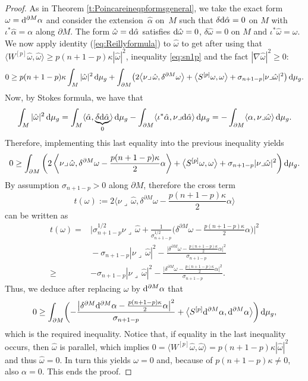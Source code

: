 \documentclass[pdftex]{sigma}
\numberwithin{equation}{section}
\begin{document}
\begin{proof} As in Theorem \ref{t:Poincareineqpformsgeneral}, we take the exact form $\omega={\rm d}^{\partial M}\alpha$ and consider the extension~$\hat\alpha$ on~$M$ such that $\delta {\rm d}\hat\alpha=0$ on $M$ with $\iota^*\hat\alpha=\alpha$ along $\partial M$.
The form $\hat\omega={\rm d}\hat\alpha$ satisfies ${\rm d}\hat\omega=0$, $\delta\hat\omega=0$ on $M$ and $\iota^*\hat\omega=\omega$.
We now apply identity (\ref{eq:Reillyformula}) to $\hat{\omega}$  to get after using that $\bigl\langle W^{[p]}\hat\omega,\hat\omega\bigr\rangle\geq p(n+1-p)\kappa|\hat\omega|^2$, inequality \eqref{eq:sn1p} and the fact $|\nabla\hat\omega|^2\geq 0$:
\[0\geq p(n+1-p)\kappa\int_M|\hat\omega|^2\,{\rm d}\mu_g+\int_{\partial M}\bigl(2\bigl\langle\nu\lrcorner\,\hat{\omega},\delta^{\partial M}\omega\bigr\rangle+\bigl\langle S^{[p]}\omega,\omega\bigr\rangle+\sigma_{n+1-p}|\nu\lrcorner\hat\omega|^2\bigr)\,{\rm d}\mu_g.
\]
Now, by Stokes formula, we have that
\[
\int_M|\hat\omega|^2\,{\rm d}\mu_g=\int_M\langle\hat\alpha,\underbrace{\delta {\rm d}\hat\alpha}_{0}\rangle\,{\rm d}\mu_g-\int_{\partial M}\langle\iota^*\hat\alpha,\nu\lrcorner {\rm d}\hat\alpha\rangle\,{\rm d}\mu_g=-\int_{\partial M}\langle\alpha,\nu\lrcorner\hat\omega\rangle\,{\rm d}\mu_g.
\]
Therefore, implementing this last equality into the previous i\-ne\-qua\-li\-ty yields
\[
0\geq \int_{\partial M}\left(2\left\langle\nu\lrcorner\,\hat{\omega},\delta^{\partial M}\omega-\frac{p(n+1-p)\kappa}{2}\alpha\right\rangle+\bigl\langle S^{[p]}\omega,\omega\bigr\rangle+\sigma_{n+1-p}|\nu\lrcorner\hat\omega|^2\right) {\rm d}\mu_g.
\]
By assumption $\sigma_{n+1-p}>0$ along $\partial M$, therefore the cross term
\[
t(\omega):=2\biggl\langle\nu\lrcorner\,\hat{\omega},\delta^{\partial M}\omega-\frac{p(n+1-p)\kappa}{2}\alpha\biggr\rangle
\] can be written as
\begin{align*} %
t(\omega)={}& \biggl|\sigma_{n+1-p}^{1/2}\nu\lrcorner\,\hat{\omega}+\frac{1}{\sigma_{n+1-p}^{1/2}}\bigl(\delta^{\partial M}\omega-\frac{p(n+1-p)\kappa}{2}\alpha\bigr)\biggr|^2\nonumber\\
&{}-\sigma_{n+1-p}|\nu\lrcorner\,\hat{\omega}|^2\nonumber-\frac{\bigl|\delta^{\partial M}\omega-\frac{p(n+1-p)\kappa}{2}\alpha\bigr|^2}{\sigma_{n+1-p}}\nonumber\\
 \geq{} & -\sigma_{n+1-p}|\nu\lrcorner\,\hat{\omega}|^2-\frac{\bigl|\delta^{\partial M}\omega-\frac{p(n+1-p)\kappa}{2}\alpha\bigr|^2}{\sigma_{n+1-p}}.
\end{align*}
Thus, we deduce after replacing $\omega$ by ${\rm d}^{\partial M}\alpha$ that
\[0\geq \int_{\partial M}\biggl(-\frac{\bigl|\delta^{\partial M}{\rm d}^{\partial M}\alpha-\frac{p(n+1-p)\kappa}{2}\alpha\bigr|^2}{\sigma_{n+1-p}}+\bigl\langle S^{[p]}{\rm d}^{\partial M}\alpha,{\rm d}^{\partial M}\alpha\bigr\rangle\biggr)\,{\rm d}\mu_g,
\]
which is the required i\-ne\-qua\-li\-ty. Notice that, if equality in the last i\-ne\-qua\-li\-ty occurs, then $\hat\omega$ is parallel, which implies $0=\langle W^{[p]}\hat\omega,\hat\omega\rangle= p(n+1-p)\kappa|\hat\omega|^2$ and thus $\hat\omega=0$. In turn this yields $\omega=0$ and, because of $p(n+1-p)\kappa\neq0$, also $\alpha=0$. This ends the proof.
\end{proof}
\end{document}

